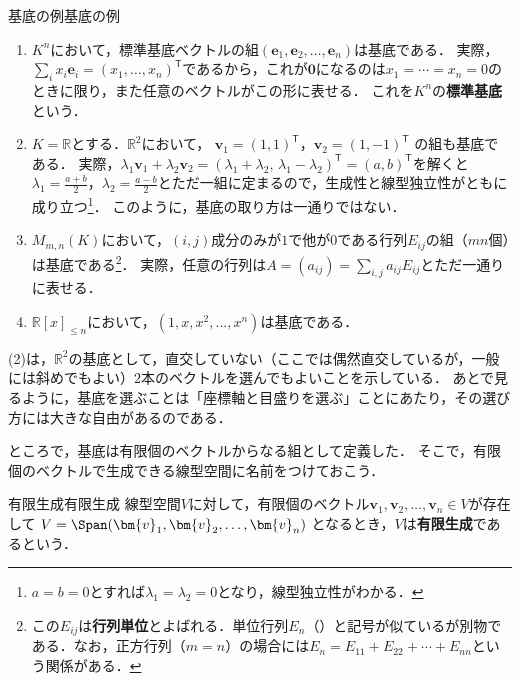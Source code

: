 \begin{example}{基底の例}{基底の例}
  \begin{enumerate}[label=(\arabic*),leftmargin=3.2em]
    \item $K^n$において，標準基底ベクトルの組$(\bm{e}_1, \bm{e}_2, \dots, \bm{e}_n)$は基底である．
    実際，$\sum_i x_i\bm{e}_i=(x_1,\dots,x_n)^\mathsf{T}$であるから，これが$\bm{0}$になるのは$x_1=\cdots=x_n=0$のときに限り，また任意のベクトルがこの形に表せる．
    これを$K^n$の\textbf{標準基底}という．

    \item $K=\mathbb{R}$とする．$\mathbb{R}^2$において，
    $\bm{v}_1 = (1,1)^\mathsf{T}$，$\bm{v}_2 = (1,-1)^\mathsf{T}$
    の組も基底である．
    実際，$\lambda_1\bm{v}_1+\lambda_2\bm{v}_2=(\lambda_1+\lambda_2,\,\lambda_1-\lambda_2)^\mathsf{T}=(a,b)^\mathsf{T}$を解くと$\lambda_1=\frac{a+b}{2}$，$\lambda_2=\frac{a-b}{2}$とただ一組に定まるので，生成性と線型独立性がともに成り立つ\footnote{$a=b=0$とすれば$\lambda_1=\lambda_2=0$となり，線型独立性がわかる．}．
    このように，基底の取り方は一通りではない．

    \item $M_{m,n}(K)$において，$(i,j)$成分のみが$1$で他が$0$である行列$E_{ij}$の組（$mn$個）は基底である\footnote{この$E_{ij}$は\textbf{行列単位}とよばれる．単位行列$E_n$（）と記号が似ているが別物である．なお，正方行列（$m = n$）の場合には$E_n = E_{11} + E_{22} + \cdots + E_{nn}$という関係がある．}．
    実際，任意の行列は$A=(a_{ij})=\sum_{i,j}a_{ij}E_{ij}$とただ一通りに表せる．

    \item $\mathbb{R}[x]_{\le n}$において，$(1, x, x^2, \dots, x^n)$は基底である．
  \end{enumerate}
\end{example}

(2)は，$\mathbb{R}^2$の基底として，直交していない（ここでは偶然直交しているが，一般には斜めでもよい）$2$本のベクトルを選んでもよいことを示している．
あとで見るように，基底を選ぶことは「座標軸と目盛りを選ぶ」ことにあたり，その選び方には大きな自由があるのである．

ところで，基底は有限個のベクトルからなる組として定義した．
そこで，有限個のベクトルで生成できる線型空間に名前をつけておこう．

\begin{definition}{有限生成}{有限生成}
  線型空間$V$に対して，有限個のベクトル$\bm{v}_1, \bm{v}_2, \dots, \bm{v}_n \in V$が存在して
  $V = \Span(\bm{v}_1, \bm{v}_2, \dots, \bm{v}_n)$
  となるとき，$V$は\textbf{有限生成}であるという．
\end{definition}

